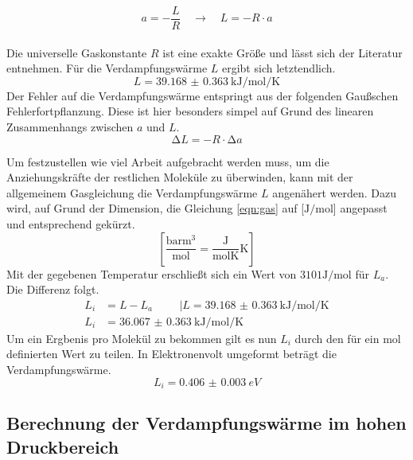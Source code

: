 \begin{equation}
a = -\frac{L}{R} \quad \to \quad L = -R \cdot a
\end{equation}
\\
Die universelle Gaskonstante $R$ ist eine exakte Größe und lässt sich der Literatur \cite{Naturkonstanten} entnehmen.
Für die Verdampfungswärme $L$ ergibt sich letztendlich.
\begin{equation}
L = \SI{39.168(0363)}{\kilo\joule\per\mol\per\kelvin}
\end{equation}
Der Fehler auf die Verdampfungswärme entspringt aus der folgenden Gaußschen Fehlerfortpflanzung. Diese ist hier besonders simpel auf Grund des linearen Zusammenhangs zwischen $a$ und $L$. 
\begin{equation}
\increment L = -R \cdot \increment a
\end{equation}

Um festzustellen wie viel Arbeit aufgebracht werden muss, um die Anziehungskräfte der restlichen Moleküle zu überwinden,
kann mit der allgemeinem Gasgleichung die Verdampfungswärme $L$ angenähert werden.
Dazu wird, auf Grund der Dimension, die Gleichung \eqref{eqn:gas} auf [$\si{\joule}/\si{\mol}$] angepasst und entsprechend gekürzt.
\begin{equation}
    \left[\frac{\si{\bar\meter\tothe{3}}}{\si{\mol}}=\frac{\si{\joule}}{\si{\mol\kelvin}}\si{\kelvin}\right]
\end{equation}
Mit der gegebenen Temperatur erschließt sich ein Wert von $3101\si{\joule\per\mol}$ für $L_a$. Die Differenz folgt.
\begin{align*}
    L_i&=L-L_a \hspace{1cm}  | L = \SI{39.168(0363)}{\kilo\joule\per\mol\per\kelvin} \\
    L_i&= \SI{36.067(0363)}{\kilo\joule\per\mol\per\kelvin}
\end{align*}
Um ein Ergbenis pro Molekül zu bekommen gilt es nun $L_i$ durch den für ein $\si{\mol}$ definierten Wert zu teilen.
In Elektronenvolt umgeformt beträgt die Verdampfungswärme.
\begin{equation}    
    L_i= \SI{0.406(0003)}{eV}
\end{equation}

\subsection{Berechnung der Verdampfungswärme im hohen Druckbereich}

